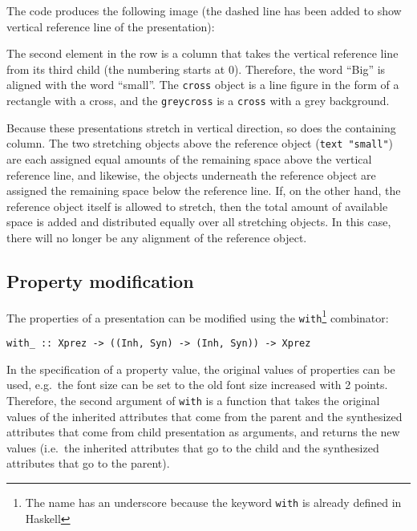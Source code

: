 \toHere
The code produces the following image (the dashed line has been added to show vertical reference line of the presentation):

\begin{center}
\end{center}

The second element in the row is a column that takes the vertical reference line from its third child (the numbering starts at 0). Therefore, the word ``Big'' is aligned with the word ``small''. The \texttt{cross} object is a line figure in the form of a rectangle with a cross, and the \texttt{greycross} is a \texttt{cross} with a grey background. 
 
Because these presentations stretch in vertical direction, so does the containing column. The two stretching objects above the reference object (\texttt{text "small"}) are each assigned equal amounts of the remaining space above the vertical reference line, and likewise, the objects underneath the reference object are assigned the remaining space below the reference line. If, on the other hand, the reference object itself is allowed to stretch, then the total amount of available space is added and distributed equally over all stretching objects. In this case, there will no longer be any alignment of the reference object. 


%																
\subsection{Property modification}

The properties of a presentation can be modified using the \texttt{with}\footnote{The name has an underscore because the keyword {\tt with} is already defined in Haskell} combinator:

\begin{small}
\begin{verbatim}
with_ :: Xprez -> ((Inh, Syn) -> (Inh, Syn)) -> Xprez
\end{verbatim}
\end{small}

In the specification of a property value, the original values of properties can be used, e.g.\ the font size can be set to the old font size increased with 2 points. Therefore, the second argument of \texttt{with} is a function that takes the original values of the inherited attributes that come from the parent and the synthesized attributes that come from child presentation as arguments, and returns the new values (i.e.\ the inherited attributes that go to the child and the synthesized attributes that go to the parent).

